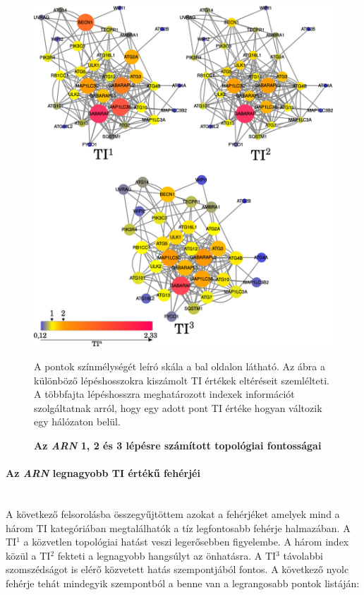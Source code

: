 \documentclass[a4paper,12pt]{article}
\newenvironment{imgdesc}{
		\small
		\singlespacing
		\begin{center}
		
	}{
		\end{center}	
	}
\begin{document}
				
				\begin{figure}[H]
									\includegraphics[scale=0.54]{img/arn_123_comp.pdf}
									\centering
									\caption{ \textbf{Az \textit{ARN} 1, 2 és 3 lépésre számított topológiai fontosságai}}
									\begin{imgdesc}
										A pontok színmélységét leíró skála a bal oldalon látható. Az ábra a különböző lépéshosszokra kiszámolt TI értékek eltéréseit szemlélteti. A többfajta lépéshosszra meghatározott indexek információt szolgáltatnak arról, hogy egy adott pont TI értéke hogyan változik egy hálózaton belül.
									\end{imgdesc}
						
									\label{fig:arn123}			 		 
				\end{figure}
				
				
				\paragraph{Az \textit{ARN} legnagyobb TI értékű fehérjéi} \mbox{}\\
				A következő felsorolásba összegyűjtöttem azokat a fehérjéket amelyek mind a három TI kategóriában megtalálhatók a tíz legfontosabb fehérje halmazában. 			
				A TI$^1$ a közvetlen topológiai hatást veszi legerősebben figyelembe. A három index közül a TI$^2$ fekteti a legnagyobb hangsúlyt az önhatásra. A TI$^3$  távolabbi szomszédságot is elérő közvetett hatás szempontjából fontos. A következő nyolc fehérje tehát mindegyik szempontból a benne van a legrangosabb pontok listáján:
				
\end{document}
